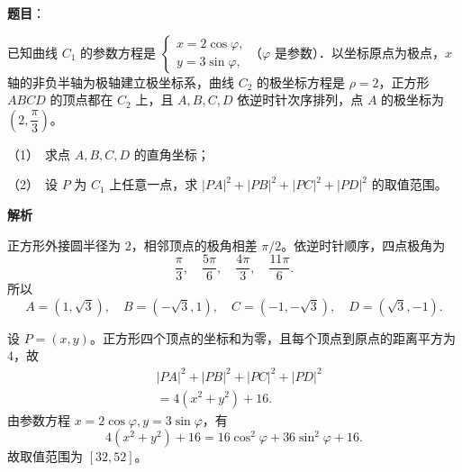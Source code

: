 \begin{answer}

\textbf{题目}：

已知曲线 $C_1$ 的参数方程是 $\begin{cases}x=2\cos\varphi,\\y=3\sin\varphi,\end{cases}$（$\varphi$ 是参数）．以坐标原点为极点，$x$ 轴的非负半轴为极轴建立极坐标系，曲线 $C_2$ 的极坐标方程是 $\rho=2$，正方形 $ABCD$ 的顶点都在 $C_2$ 上，且 $A,B,C,D$ 依逆时针次序排列，点 $A$ 的极坐标为 $(2,\dfrac\pi3)$。

（1）　求点 $A,B,C,D$ 的直角坐标；

（2）　设 $P$ 为 $C_1$ 上任意一点，求 $|PA|^2+|PB|^2+|PC|^2+|PD|^2$ 的取值范围。

\textbf{解析}


正方形外接圆半径为 $2$，相邻顶点的极角相差 $\pi/2$。依逆时针顺序，四点极角为
\nopagebreak[4]
\[
\frac\pi3,\quad\frac{5\pi}6,\quad\frac{4\pi}3,\quad\frac{11\pi}6.
\]
所以
\nopagebreak[4]
\[
A=(1,\sqrt3),\quad B=(-\sqrt3,1),\quad C=(-1,-\sqrt3),\quad D=(\sqrt3,-1).
\]


设 $P=(x,y)$。正方形四个顶点的坐标和为零，且每个顶点到原点的距离平方为 $4$，故
\nopagebreak[4]
\[
\begin{aligned}
&|PA|^2+|PB|^2+|PC|^2+|PD|^2\\
&=4(x^2+y^2)+16.
\end{aligned}
\]
由参数方程 $x=2\cos\varphi,y=3\sin\varphi$，有
\nopagebreak[4]
\[
4(x^2+y^2)+16=16\cos^2\varphi+36\sin^2\varphi+16.
\]
故取值范围为 $[32,52]$。



\end{answer}
